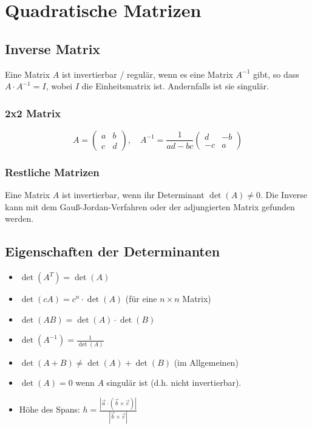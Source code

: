 \documentclass{article}
\begin{document}
\section*{Quadratische Matrizen}
\begin{minipage}[t]{0.45\textwidth}
    \subsection*{Inverse Matrix}
    Eine Matrix \( A \) ist invertierbar / regulär, wenn es eine Matrix \( A^{-1} \) gibt, so dass \( A \cdot A^{-1} = I \), wobei \( I \) die Einheitsmatrix ist. Andernfalls ist sie singulär.
    \subsubsection*{2x2 Matrix}
    \begin{equation*}
        A = \begin{pmatrix}
        a & b \\
        c & d
        \end{pmatrix}, \quad
        A^{-1} = \frac{1}{ad - bc} \begin{pmatrix}
        d & -b \\
        -c & a
        \end{pmatrix}
    \end{equation*}
    \subsubsection*{Restliche Matrizen}
    Eine Matrix \( A \) ist invertierbar, wenn ihr Determinant \( \det(A) \neq 0 \). Die Inverse kann mit dem Gauß-Jordan-Verfahren oder der adjungierten Matrix gefunden werden.
    
    \subsection*{Eigenschaften der Determinanten}
    \begin{itemize}
        \item \( \det(A^T) = \det(A) \)
        \item \( \det(cA) = c^n \cdot \det(A) \) (für eine \( n \times n \) Matrix)
        \item \( \det(AB) = \det(A) \cdot \det(B) \)
        \item \( \det(A^{-1}) = \frac{1}{\det(A)} \)
        \item \( \det(A + B) \neq \det(A) + \det(B) \) (im Allgemeinen)
        \item \( \det(A) = 0 \) wenn \( A \) singulär ist (d.h. nicht invertierbar).
        \item Höhe des Spans: $h = \frac{|\vec{a} \cdot (\vec{b} \times \vec{c})|}{|\vec{b} \times \vec{c}|}$
    \end{itemize}
\end{minipage}
\end{document}
